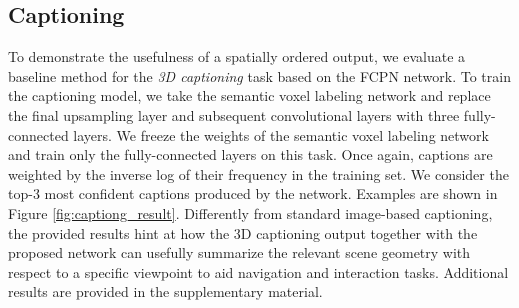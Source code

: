 \documentclass[runningheads]{llncs}
\begin{document}
\begin{table}[h]
\centering
\caption{Results of our FCPN on ShapeNet's part segmentation dataset compared to other state-of-the-art methods. Please note, that we outperform all other methods in 12 out of 16 classes}
\label{table:part_segmentation}
\end{table}



\subsection{Captioning}
\label{section:EvalCaptioniong}

To demonstrate the usefulness of a spatially ordered output, we evaluate a baseline method for the \textit{3D captioning} task based on the FCPN network. 
To train the captioning model, we take the semantic voxel labeling network and replace the final upsampling layer and subsequent convolutional layers with three fully-connected layers. We freeze the weights of the semantic voxel labeling network and train only the fully-connected layers on this task. Once again, captions are weighted by the inverse log of their frequency in the training set. We consider the top-3 most confident captions produced by the network. Examples are shown in Figure \ref{fig:captiong_result}. Differently from standard image-based captioning, the provided results hint at how the 3D captioning output together with the proposed network can usefully summarize the relevant scene geometry with respect to a specific viewpoint to aid navigation and interaction tasks. Additional results are provided in the supplementary material. 
\end{document}
